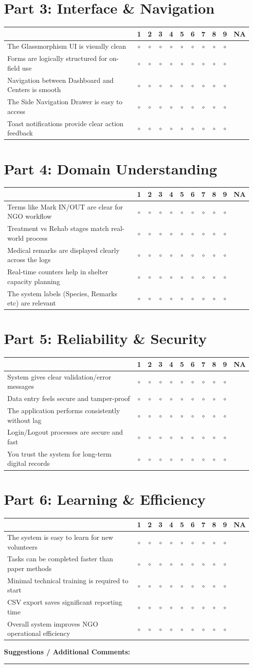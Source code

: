 \documentclass[12pt,a4paper]{report}
\newcommand{\opt}{\(\circ\)}
\newcommand{\likertheader}{ & 1 & 2 & 3 & 4 & 5 & 6 & 7 & 8 & 9 & NA \\
\hline}
\newcommand{\likertrow}[1]{#1 & \opt & \opt & \opt & \opt & \opt & \opt & \opt & \opt & \opt &  \\
\hline}
\begin{document}
\section*{Part 3: Interface \& Navigation}
\begin{boxstyle}
\begin{tabularx}{\textwidth}{|Y|*{10}{c|}}
\hline
\likertheader
\likertrow{The Glassmorphism UI is visually clean}
\likertrow{Forms are logically structured for on-field use}
\likertrow{Navigation between Dashboard and Centers is smooth}
\likertrow{The Side Navigation Drawer is easy to access}
\likertrow{Toast notifications provide clear action feedback}
\end{tabularx}
\end{boxstyle}

\section*{Part 4: Domain Understanding}
\begin{boxstyle}
\begin{tabularx}{\textwidth}{|Y|*{10}{c|}}
\hline
\likertheader
\likertrow{Terms like Mark IN/OUT are clear for NGO workflow}
\likertrow{Treatment vs Rehab stages match real-world process}
\likertrow{Medical remarks are displayed clearly across the logs}
\likertrow{Real-time counters help in shelter capacity planning}
\likertrow{The system labels (Species, Remarks etc) are relevant}
\end{tabularx}
\end{boxstyle}

\section*{Part 5: Reliability \& Security}
\begin{boxstyle}
\begin{tabularx}{\textwidth}{|Y|*{10}{c|}}
\hline
\likertheader
\likertrow{System gives clear validation/error messages}
\likertrow{Data entry feels secure and tamper-proof}
\likertrow{The application performs consistently without lag}
\likertrow{Login/Logout processes are secure and fast}
\likertrow{You trust the system for long-term digital records}
\end{tabularx}
\end{boxstyle}

\section*{Part 6: Learning \& Efficiency}
\begin{boxstyle}
\begin{tabularx}{\textwidth}{|Y|*{10}{c|}}
\hline
\likertheader
\likertrow{The system is easy to learn for new volunteers}
\likertrow{Tasks can be completed faster than paper methods}
\likertrow{Minimal technical training is required to start}
\likertrow{CSV export saves significant reporting time}
\likertrow{Overall system improves NGO operational efficiency}
\end{tabularx}
\end{boxstyle}

\vspace{0.4cm}
\noindent\textbf{Suggestions / Additional Comments:}\\[0.2cm]
\rule{\textwidth}{0.4pt}
\end{document}

